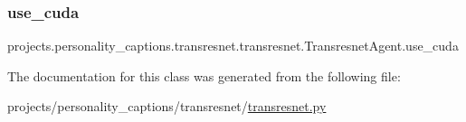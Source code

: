 \subsubsection{\texorpdfstring{use\+\_\+cuda}{use\_cuda}}
{\footnotesize\ttfamily projects.\+personality\+\_\+captions.\+transresnet.\+transresnet.\+Transresnet\+Agent.\+use\+\_\+cuda}



The documentation for this class was generated from the following file\+:\begin{DoxyCompactItemize}
\item 
projects/personality\+\_\+captions/transresnet/\hyperlink{projects_2personality__captions_2transresnet_2transresnet_8py}{transresnet.\+py}\end{DoxyCompactItemize}
